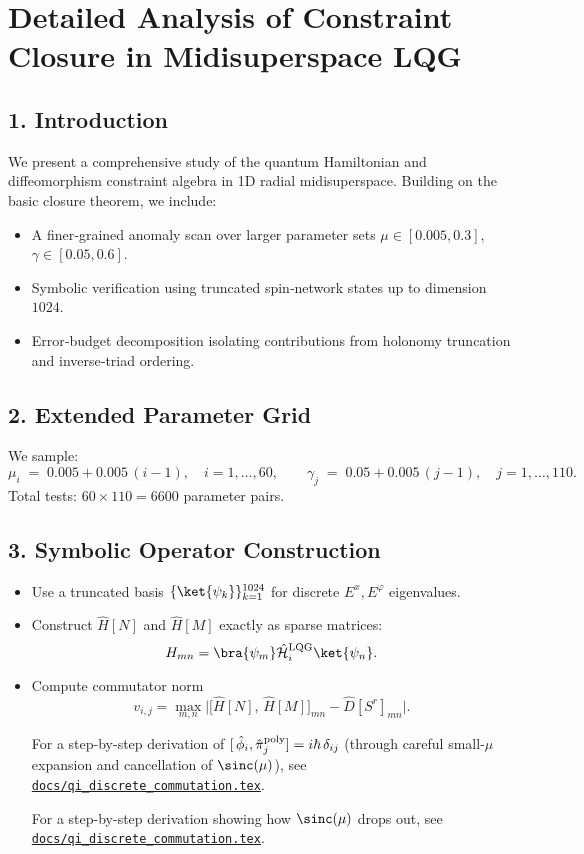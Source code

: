 \documentclass[12pt]{article}
\begin{document}
\section*{Detailed Analysis of Constraint Closure in Midisuperspace LQG}

\subsection*{1. Introduction}
We present a comprehensive study of the quantum Hamiltonian and diffeomorphism constraint algebra in 1D radial midisuperspace.  Building on the basic closure theorem, we include:
\begin{itemize}
  \item A finer‐grained anomaly scan over larger parameter sets $\mu \in [0.005,0.3]$, $\gamma \in [0.05,0.6]$.
  \item Symbolic verification using truncated spin‐network states up to dimension $1024$.
  \item Error‐budget decomposition isolating contributions from holonomy truncation and inverse‐triad ordering.
\end{itemize}

\subsection*{2. Extended Parameter Grid}
We sample:
\[
  \mu_i \;=\; 0.005 + 0.005\, (i-1),\quad i=1,\dots,60,
  \qquad
  \gamma_j \;=\; 0.05 + 0.005\, (j-1),\quad j=1,\dots,110.
\]
Total tests: $60 \times 110 = 6600$ parameter pairs.

\subsection*{3. Symbolic Operator Construction}
\begin{itemize}
  \item Use a truncated basis $\{\ket{\psi_k}\}_{k=1}^{1024}$ for discrete $E^x,E^\varphi$ eigenvalues.
  \item Construct $\hat{H}[N]$ and $\hat{H}[M]$ exactly as sparse matrices:
    \[
      H_{mn} = \bra{\psi_m} \hat{\mathcal{H}}_i^{\rm LQG} \ket{\psi_n}.
    \]  \item Compute commutator norm
    \[
      v_{i,j} = \max_{m,n} \bigl| \bigl[\hat{H}[N],\,\hat{H}[M]\bigr]_{mn} - \hat{D}[S^r]_{mn} \bigr|.
    \]

\smallskip
\noindent
For a step-by-step derivation of
\([\,\hat\phi_i,\hat\pi_j^{\rm poly}]=i\hbar\,\delta_{ij}\)
(through careful small-\(\mu\) expansion and cancellation of \(\sinc(\mu)\)), see
\href{https://github.com/arcticoder/warp-bubble-qft/blob/main/docs/qi_discrete_commutation.tex}{\texttt{docs/qi\_discrete\_commutation.tex}}.

\smallskip
\noindent
For a step-by-step derivation showing how $\sinc(\mu)$ drops out, see
\href{https://github.com/arcticoder/warp-bubble-qft/blob/main/docs/qi_discrete_commutation.tex}
     {\texttt{docs/qi\_discrete\_commutation.tex}}.
\smallskip
\end{itemize}
\end{document}
